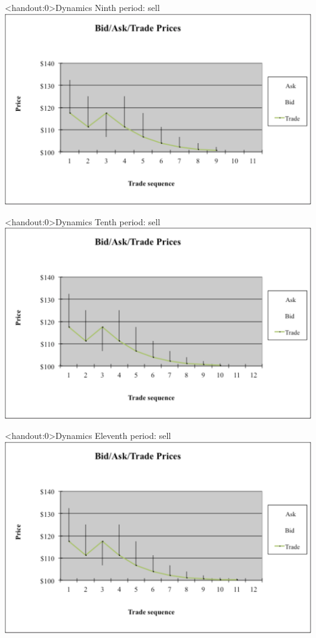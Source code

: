 \documentclass[english,10pt
,aspectratio=169
]{beamer}
\begin{document}
\begin{frame}<handout:0>{Dynamics}
	Ninth period: sell
	\center
	\includegraphics[width=0.9\linewidth]{pics/P9_Image.pdf}
\end{frame}


\begin{frame}<handout:0>{Dynamics}
	Tenth period: sell
	\center
	\includegraphics[width=0.9\linewidth]{pics/P10_Image.pdf}
\end{frame}


\begin{frame}<handout:0>{Dynamics}
	Eleventh period: sell
	\center
	\includegraphics[width=0.9\linewidth]{pics/P11_Image.pdf}
\end{frame}
\end{document}
